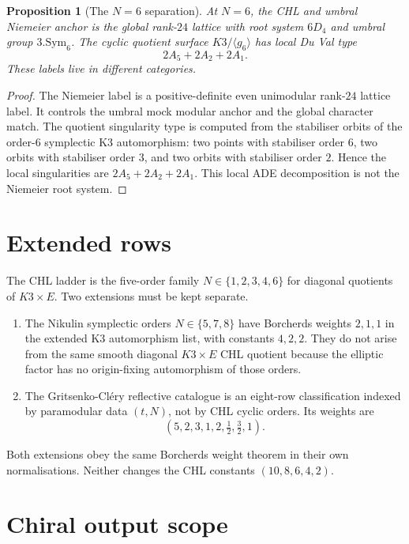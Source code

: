 \documentclass[11pt]{article}
\newtheorem{proposition}[theorem]{Proposition}
\begin{document}
\begin{proposition}[The $N=6$ separation]
\label{prop:n6-separation}
At $N=6$, the CHL and umbral Niemeier anchor is the global
rank-$24$ lattice with root system $6D_4$ and umbral group
$3.\mathrm{Sym}_6$. The cyclic quotient surface
$K3/\langle g_6\rangle$ has local Du Val type
\[
  2A_5+2A_2+2A_1 .
\]
These labels live in different categories.
\end{proposition}

\begin{proof}
The Niemeier label is a positive-definite even unimodular rank-$24$
lattice label. It controls the umbral mock modular anchor and the
global character match. The quotient singularity type is computed from
the stabiliser orbits of the order-$6$ symplectic K3 automorphism:
two points with stabiliser order $6$, two orbits with stabiliser order
$3$, and two orbits with stabiliser order $2$. Hence the local
singularities are $2A_5+2A_2+2A_1$. This local ADE decomposition is
not the Niemeier root system.
\end{proof}

\section{Extended rows}
\label{sec:extended-rows}

The CHL ladder is the five-order family
$N\in\{1,2,3,4,6\}$ for diagonal quotients of $K3\times E$. Two
extensions must be kept separate.

\begin{enumerate}
\item The Nikulin symplectic orders $N\in\{5,7,8\}$ have Borcherds
weights $2,1,1$ in the extended K3 automorphism list, with constants
$4,2,2$. They do not arise from the same smooth diagonal
$K3\times E$ CHL quotient because the elliptic factor has no
origin-fixing automorphism of those orders.
\item The Gritsenko-Cl\'ery reflective catalogue is an eight-row
classification indexed by paramodular data $(t,N)$, not by CHL cyclic
orders. Its weights are
\[
  (5,2,3,1,2,\tfrac12,\tfrac32,1).
\]
\end{enumerate}

Both extensions obey the same Borcherds weight theorem in their own
normalisations. Neither changes the CHL constants
$(10,8,6,4,2)$.

\section{Chiral output scope}
\label{sec:chiral-output-scope}
\end{document}
